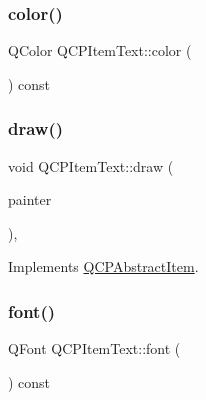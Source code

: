 \mbox{\label{class_q_c_p_item_text_a071ec7567ae4deae2262a5b861df7d54}} 
\subsubsection{\texorpdfstring{color()}{color()}}
{\footnotesize\ttfamily Q\+Color Q\+C\+P\+Item\+Text\+::color (\begin{DoxyParamCaption}{ }\end{DoxyParamCaption}) const\hspace{0.3cm}{\ttfamily [inline]}}

\mbox{\label{class_q_c_p_item_text_a8f8f075da83b6547c2b32e1f64cf0554}} 
\subsubsection{\texorpdfstring{draw()}{draw()}}
{\footnotesize\ttfamily void Q\+C\+P\+Item\+Text\+::draw (\begin{DoxyParamCaption}\item[{\mbox{\hyperlink{class_q_c_p_painter}{Q\+C\+P\+Painter}} $\ast$}]{painter }\end{DoxyParamCaption})\hspace{0.3cm}{\ttfamily [protected]}, {\ttfamily [virtual]}}



Implements \mbox{\hyperlink{class_q_c_p_abstract_item_a007fdab79c935a5da5aa04a21d268c18}{Q\+C\+P\+Abstract\+Item}}.

\mbox{\label{class_q_c_p_item_text_a44a564431890ffdfe0f978f8732cfb81}} 
\subsubsection{\texorpdfstring{font()}{font()}}
{\footnotesize\ttfamily Q\+Font Q\+C\+P\+Item\+Text\+::font (\begin{DoxyParamCaption}{ }\end{DoxyParamCaption}) const\hspace{0.3cm}{\ttfamily [inline]}}

